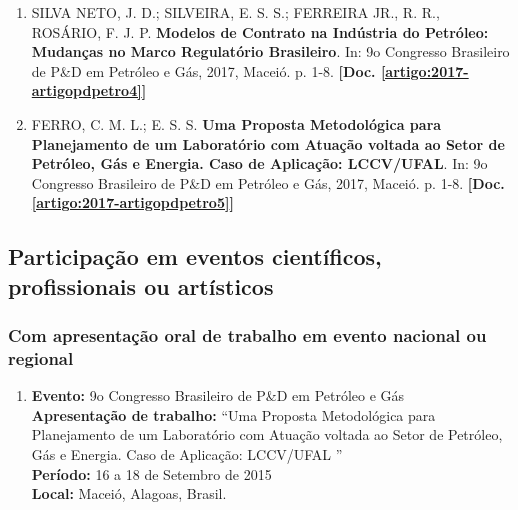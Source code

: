 \documentclass[a4paper,oneside,10pt]{article}
\begin{document}
\begin{enumerate}
\item SILVA NETO, J. D.; SILVEIRA, E. S. S.;  FERREIRA JR., R. R., ROSÁRIO, F. J. P. \textbf{Modelos de Contrato na Indústria do Petróleo: Mudanças no Marco Regulatório Brasileiro}. In: 9o Congresso Brasileiro de P\&D em Petróleo e Gás, 2017, Maceió. p. 1-8.  \textbf{[Doc. \ref{artigo:2017-artigopdpetro4}]}

\item FERRO, C. M. L.;  E. S. S. \textbf{Uma Proposta Metodológica para Planejamento de um Laboratório com Atuação voltada ao Setor de Petróleo, Gás e Energia. Caso de Aplicação: LCCV/UFAL}. In: 9o Congresso Brasileiro de P\&D em Petróleo e Gás, 2017, Maceió. p. 1-8.  \textbf{[Doc. \ref{artigo:2017-artigopdpetro5}]}


\end{enumerate}

\subsection{Participação em eventos científicos, profissionais ou artísticos}
\vspace{0.3cm}


\subsubsection{Com apresentação oral de trabalho em evento nacional ou regional}
\vspace{0.3cm}

\begin{enumerate}
\renewcommand{\labelenumi}{{\large\bfseries\arabic{enumi}.}}

\item   \textbf{Evento:} 9o Congresso Brasileiro de P\&D em Petróleo e Gás
 \mbox{} \\
        \textbf{Apresentação de trabalho:} ``Uma Proposta Metodológica para Planejamento de um Laboratório com Atuação voltada ao Setor de Petróleo, Gás e Energia. Caso de Aplicação: LCCV/UFAL ''\\
        \textbf{Período:} 16 a 18 de Setembro de 2015\\
        \textbf{Local:} Maceió, Alagoas, Brasil.

\end{enumerate}
\end{document}
